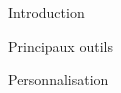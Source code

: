 \begin{frame}{Introduction}
  
\end{frame}

\begin{frame}{Principaux outils}
  
\end{frame}

\begin{frame}{Personnalisation}
  
\end{frame}